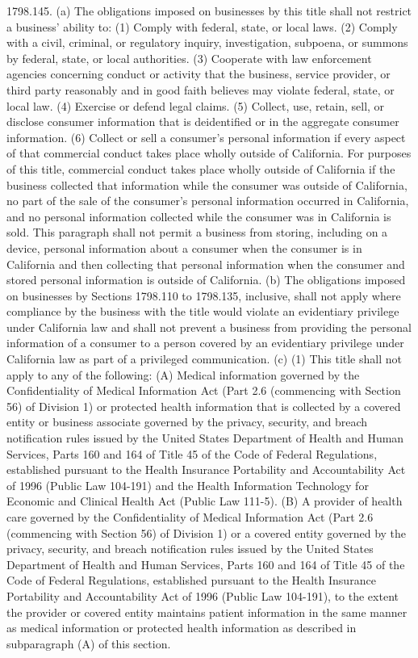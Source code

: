 1798.145.  (a) The obligations imposed on businesses by this title shall not restrict a business’ ability to:
(1) Comply with federal, state, or local laws.
(2) Comply with a civil, criminal, or regulatory inquiry, investigation, subpoena, or summons by federal, state, or local authorities.
(3) Cooperate with law enforcement agencies concerning conduct or activity that the business, service provider, or third party reasonably and in good faith believes may violate federal, state, or local law.
(4) Exercise or defend legal claims.
(5) Collect, use, retain, sell, or disclose consumer information that is deidentified or in the aggregate consumer information.
(6) Collect or sell a consumer’s personal information if every aspect of that commercial conduct takes place wholly outside of California. For purposes of this title, commercial conduct takes place wholly outside of California if the business collected that information while the consumer was outside of California, no part of the sale of the consumer’s personal information occurred in California, and no personal information collected while the consumer was in California is sold. This paragraph shall not permit a business from storing, including on a device, personal information about a consumer when the consumer is in California and then collecting that personal information when the consumer and stored personal information is outside of California.
(b) The obligations imposed on businesses by Sections 1798.110 to 1798.135, inclusive, shall not apply where compliance by the business with the title would violate an evidentiary privilege under California law and shall not prevent a business from providing the personal information of a consumer to a person covered by an evidentiary privilege under California law as part of a privileged communication.
(c) (1) This title shall not apply to any of the following:
(A) Medical information governed by the Confidentiality of Medical Information Act (Part 2.6 (commencing with Section 56) of Division 1) or protected health information that is collected by a covered entity or business associate governed by the privacy, security, and breach notification rules issued by the United States Department of Health and Human Services, Parts 160 and 164 of Title 45 of the Code of Federal Regulations, established pursuant to the Health Insurance Portability and Accountability Act of 1996 (Public Law 104-191) and the Health Information Technology for Economic and Clinical Health Act (Public Law 111-5).
(B) A provider of health care governed by the Confidentiality of Medical Information Act (Part 2.6 (commencing with Section 56) of Division 1) or a covered entity governed by the privacy, security, and breach notification rules issued by the United States Department of Health and Human Services, Parts 160 and 164 of Title 45 of the Code of Federal Regulations, established pursuant to the Health Insurance Portability and Accountability Act of 1996 (Public Law 104-191), to the extent the provider or covered entity maintains patient information in the same manner as medical information or protected health information as described in subparagraph (A) of this section.
